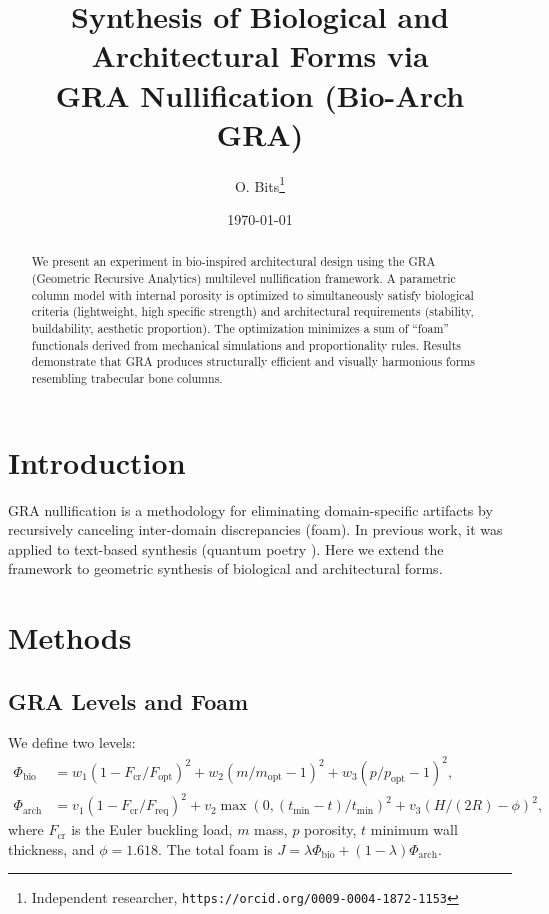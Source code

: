 \documentclass{article}
\title{Synthesis of Biological and Architectural Forms via\\ GRA Nullification (Bio-Arch GRA)}
\author{O. Bits\footnote{Independent researcher, \texttt{https://orcid.org/0009-0004-1872-1153}}}
\date{\today}
\begin{document}
\maketitle

\begin{abstract}
We present an experiment in bio-inspired architectural design using the GRA (Geometric Recursive Analytics) multilevel nullification framework. A parametric column model with internal porosity is optimized to simultaneously satisfy biological criteria (lightweight, high specific strength) and architectural requirements (stability, buildability, aesthetic proportion). The optimization minimizes a sum of ``foam'' functionals derived from mechanical simulations and proportionality rules. Results demonstrate that GRA produces structurally efficient and visually harmonious forms resembling trabecular bone columns.
\end{abstract}

\section{Introduction}
GRA nullification \cite{gra_metatheorem} is a methodology for eliminating domain-specific artifacts by recursively canceling inter-domain discrepancies (foam). In previous work, it was applied to text-based synthesis (quantum poetry \cite{gra_quantum_poetry}). Here we extend the framework to geometric synthesis of biological and architectural forms.

\section{Methods}
\subsection{GRA Levels and Foam}
We define two levels:
\begin{align}
\Phi_{\text{bio}} &= w_1 (1 - F_{\text{cr}}/F_{\text{opt}})^2 + w_2 (m/m_{\text{opt}}-1)^2 + w_3 (p/p_{\text{opt}}-1)^2, \\
\Phi_{\text{arch}} &= v_1 (1 - F_{\text{cr}}/F_{\text{req}})^2 + v_2 \max(0,(t_{\text{min}}-t)/t_{\text{min}})^2 + v_3 (H/(2R)-\phi)^2,
\end{align}
where $F_{\text{cr}}$ is the Euler buckling load, $m$ mass, $p$ porosity, $t$ minimum wall thickness, and $\phi=1.618$. The total foam is $J = \lambda \Phi_{\text{bio}} + (1-\lambda)\Phi_{\text{arch}}$.
\end{document}
